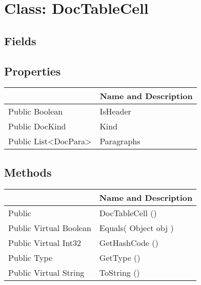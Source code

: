 \documentclass[11pt, oneside, a4paper]{book}
\begin{document}
\hypertarget{SoftwareEngineeringTools.{}Documentation.{}DocTableCell}{}
\section{Class: DocTableCell}

\subsection{Fields}

\subsection{Properties}
\begin{center}
\begin{tabular}{| p{3cm} | p{12cm} | }
\hline
\textbf{ } & \textbf{ Name and Description}\\
\hline
 Public  Boolean &  IsHeader\hypertarget{SoftwareEngineeringTools.{}Documentation.{}DocTableCell.{}IsHeader}{}\\
\hline
 Public  DocKind &  Kind\hypertarget{SoftwareEngineeringTools.{}Documentation.{}DocTableCell.{}Kind}{}\\
\hline
 Public  List<DocPara> &  Paragraphs\hypertarget{SoftwareEngineeringTools.{}Documentation.{}DocTableCell.{}Paragraphs}{}\\
\hline
\end{tabular}
\end{center}

\subsection{Methods}
\begin{center}
\begin{tabular}{| p{3cm} | p{12cm} | }
\hline
\textbf{ } & \textbf{ Name and Description}\\
\hline
 Public  &  DocTableCell ()\hypertarget{SoftwareEngineeringTools.{}Documentation.{}DocTableCell.{}DocTableCell}{}\\
\hline
 Public  Virtual  Boolean &  Equals(\hypertarget{SoftwareEngineeringTools.{}Documentation.{}DocTableCell.{}Equals\_Object}{} Object  obj  )\\
\hline
 Public  Virtual  Int32 &  GetHashCode ()\hypertarget{SoftwareEngineeringTools.{}Documentation.{}DocTableCell.{}GetHashCode}{}\\
\hline
 Public  Type &  GetType ()\hypertarget{SoftwareEngineeringTools.{}Documentation.{}DocTableCell.{}GetType}{}\\
\hline
 Public  Virtual  String &  ToString ()\hypertarget{SoftwareEngineeringTools.{}Documentation.{}DocTableCell.{}ToString}{}\\
\hline
\end{tabular}
\end{center}
 
\end{document}
